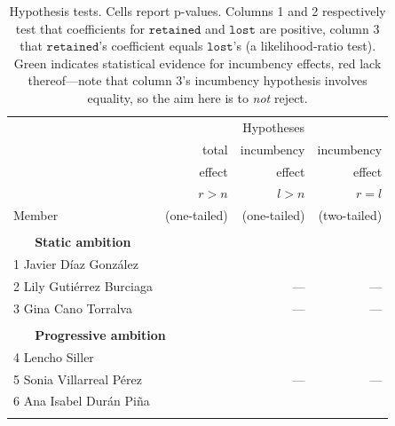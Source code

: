 \documentclass[letter,12pt]{article}
\begin{document}
\begin{table}
\centering
  \begin{tabular}{lrrr}
                          & \multicolumn{3}{c}{Hypotheses} \\
                          & total & incumbency & incumbency \\ [-0.5ex] 
                          & effect& effect     & effect \\  [-0.5ex] 
                          & $r>n$ & $l>n$ & $r = l$ \\ [-0.5ex] 
  Member                  & \footnotesize{(one-tailed)} & \footnotesize{(one-tailed)} & \footnotesize{(two-tailed)} \\ \hline \\[-1.8ex]
  \multicolumn{4}{l}{\textbf{~~~Static ambition}} \\
1 Javier Díaz González    & \color{green}{$<.001$} & \color{green}{$.029$} & \color{green}{$.442$} \\
2 Lily Gutiérrez Burciaga & \color{green}{$<.001$} & ---    & --- \\
3 Gina Cano Torralva      & \color{green}{$<.001$} & ---    & --- \\ \\[-1.8ex]
  \multicolumn{4}{l}{\textbf{~~~Progressive ambition}} \\
4 Lencho Siller           & \color{green}{$<.001$} & \color{green}{$.003$} & \color{red}{$.002$} \\
5 Sonia Villarreal Pérez  & \color{green}{$<.001$} & ---    & --- \\
6 Ana Isabel Durán Piña   & \color{green}{$<.001$} & \color{green}{$.036$} & \color{red}{$<.001$} \\
\\[-1.8ex] \hline
\end{tabular}
\caption{Hypothesis tests. Cells report p-values. Columns 1 and 2 respectively test that coefficients for $\texttt{retained}$ and $\texttt{lost}$ are positive, column 3 that $\texttt{retained}$'s coefficient equals $\texttt{lost}$'s (a likelihood-ratio test). Green indicates statistical evidence for incumbency effects, red lack thereof---note that column 3's incumbency hypothesis involves equality, so the aim here is to \emph{not} reject.}\label{T:hyp-tests}
\end{table}
\end{document}
